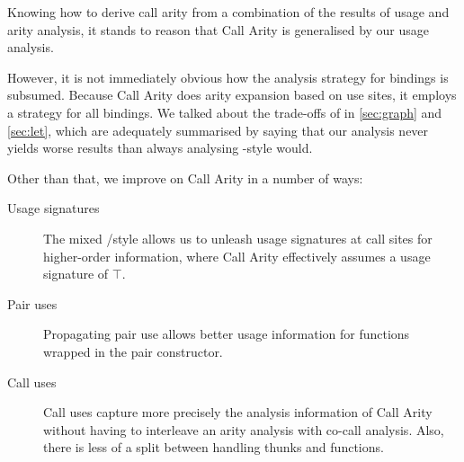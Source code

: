 Knowing how to derive call arity from a combination of the results of usage and arity analysis, it stands to reason that Call Arity is generalised by our usage analysis.

However, it is not immediately obvious how the analysis strategy for  bindings is subsumed.
Because Call Arity does arity expansion based on use sites, it employs a  strategy for all bindings.
We talked about the trade-offs of  \vs {} in \cref{sec:graph} and \cref{sec:let}, which are adequately summarised by saying that our analysis never yields worse results than always analysing -style would.

Other than that, we improve on Call Arity in a number of ways:

\begin{description}
  \item[Usage signatures] The mixed / style allows us to unleash usage signatures at call sites for higher-order information, where Call Arity effectively assumes a usage signature of $\top$.
  \item[Pair uses] Propagating pair use allows better usage information for functions wrapped in the pair constructor.
  \item[Call uses] Call uses capture more precisely the analysis information of Call Arity without having to interleave an arity analysis with co-call analysis. Also, there is less of a split between handling thunks and functions.
\end{description}

